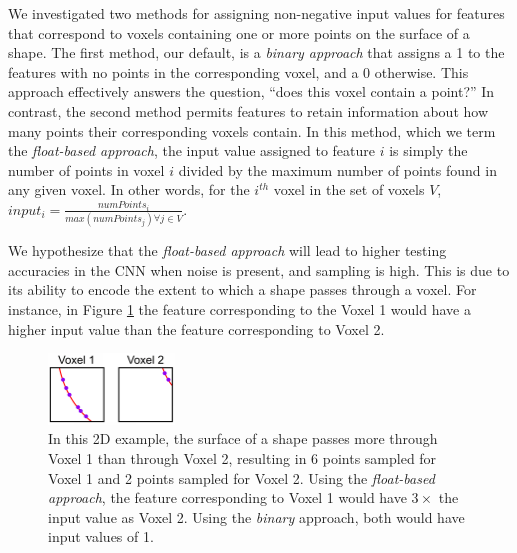 \documentclass{article}
\begin{document}
We investigated two methods for assigning non-negative input values for features that
correspond to voxels containing one or more points on the surface of a shape.
The first method, our default, is a \textit{binary approach} that assigns a 1
to the features with no points in the corresponding voxel, and a 0 otherwise.
This approach effectively answers the question, ``does this voxel contain a point?''
In contrast, the second method permits features to retain information about how
many points their corresponding voxels contain. In this method, which we term the
\textit{float-based approach}, the input value assigned to feature $i$ is simply
the number of points in voxel $i$ divided by the maximum number of points found
in any given voxel. In other words, for the $i^{th}$ voxel in the set of voxels
$V$, $input_i = \frac{numPoints_i}{max(numPoints_j) \forall j \in V}$.

We hypothesize that the \textit{float-based approach} will lead to higher testing
accuracies in the CNN when noise is present, and sampling is high. This is due to its
ability to encode the extent to which a shape passes through a voxel. For instance,
in Figure \ref{voxel-example} the feature corresponding to the Voxel 1 would have a higher input value than the feature corresponding to Voxel 2.

\begin{figure}
  \centering
      \includegraphics[width=0.3\textwidth]{graphics/float-based-example.png}
    \caption{In this 2D example, the surface of a shape passes more through Voxel 1 than through Voxel 2, resulting in 6 points sampled for Voxel 1 and 2 points sampled for Voxel 2. Using the \textit{float-based approach}, the feature corresponding to Voxel 1 would have $3\times$ the input value as Voxel 2. Using the \textit{binary} approach, both would have input values of 1.}
    \label{voxel-example}
\end{figure}
\end{document}
